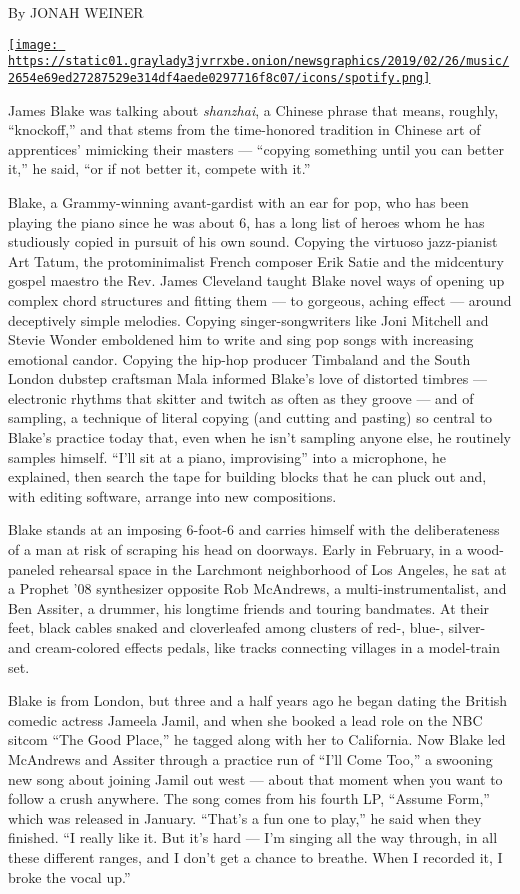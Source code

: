 By JONAH WEINER

\href{https://open.spotify.com/track/6cJrQc34txUzXd90xWEAOh}{\texttt{[image: https://static01.graylady3jvrrxbe.onion/newsgraphics/2019/02/26/music/2654e69ed27287529e314df4aede0297716f8c07/icons/spotify.png]}}

James Blake was talking about \emph{shanzhai}, a Chinese phrase that
means, roughly, ``knockoff,'' and that stems from the time-honored
tradition in Chinese art of apprentices' mimicking their masters ---
``copying something until you can better it,'' he said, ``or if not
better it, compete with it.''

Blake, a Grammy-winning avant-gardist with an ear for pop, who has been
playing the piano since he was about 6, has a long list of heroes whom
he has studiously copied in pursuit of his own sound. Copying the
virtuoso jazz-pianist Art Tatum, the protominimalist French composer
Erik Satie and the midcentury gospel maestro the Rev. James Cleveland
taught Blake novel ways of opening up complex chord structures and
fitting them --- to gorgeous, aching effect --- around deceptively
simple melodies. Copying singer-songwriters like Joni Mitchell and
Stevie Wonder emboldened him to write and sing pop songs with increasing
emotional candor. Copying the hip-hop producer Timbaland and the South
London dubstep craftsman Mala informed Blake's love of distorted timbres
--- electronic rhythms that skitter and twitch as often as they groove
--- and of sampling, a technique of literal copying (and cutting and
pasting) so central to Blake's practice today that, even when he isn't
sampling anyone else, he routinely samples himself. ``I'll sit at a
piano, improvising'' into a microphone, he explained, then search the
tape for building blocks that he can pluck out and, with editing
software, arrange into new compositions.

Blake stands at an imposing 6-foot-6 and carries himself with the
deliberateness of a man at risk of scraping his head on doorways. Early
in February, in a wood-paneled rehearsal space in the Larchmont
neighborhood of Los Angeles, he sat at a Prophet '08 synthesizer
opposite Rob McAndrews, a multi-instrumentalist, and Ben Assiter, a
drummer, his longtime friends and touring bandmates. At their feet,
black cables snaked and cloverleafed among clusters of red-, blue-,
silver- and cream-colored effects pedals, like tracks connecting
villages in a model-train set.

Blake is from London, but three and a half years ago he began dating the
British comedic actress Jameela Jamil, and when she booked a lead role
on the NBC sitcom ``The Good Place,'' he tagged along with her to
California. Now Blake led McAndrews and Assiter through a practice run
of ``I'll Come Too,'' a swooning new song about joining Jamil out west
--- about that moment when you want to follow a crush anywhere. The song
comes from his fourth LP, ``Assume Form,'' which was released in
January. ``That's a fun one to play,'' he said when they finished. ``I
really like it. But it's hard --- I'm singing all the way through, in
all these different ranges, and I don't get a chance to breathe. When I
recorded it, I broke the vocal up.''

